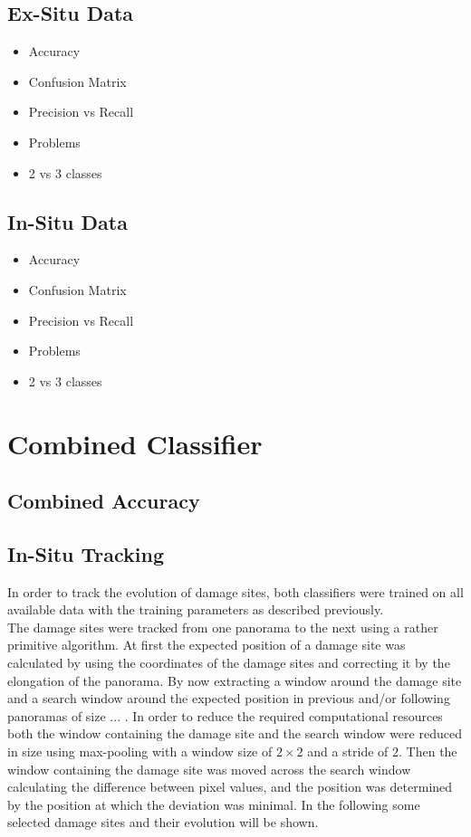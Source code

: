 \subsection{Ex-Situ Data}
\begin{itemize}
\item Accuracy
\item Confusion Matrix
\item Precision vs Recall
\item Problems
\item 2 vs 3 classes
\end{itemize}

\subsection{In-Situ Data}
\begin{itemize}
\item Accuracy
\item Confusion Matrix
\item Precision vs Recall
\item Problems
\item 2 vs 3 classes
\end{itemize}

\section{Combined Classifier}

\subsection{Combined Accuracy}
\subsection{In-Situ Tracking}
In order to track the evolution of damage sites, both classifiers were trained on all available data with the training parameters as described previously. \\

The damage sites were tracked from one panorama to the next using a rather primitive algorithm. At first the expected position of a damage site was calculated by using the coordinates of the damage sites and correcting it by the elongation of the panorama. By now extracting a window around the damage site and a search window around the expected position in previous and/or following panoramas of size ... . In order to reduce the required computational resources both the window containing the damage site and the search window were reduced in size using max-pooling with a window size of $2\times 2$ and a stride of $2$. Then the window containing the damage site was moved across the search window calculating the difference between pixel values, and the position was determined by the position at which the deviation was minimal. In the following some selected damage sites and their evolution will be shown. \\

